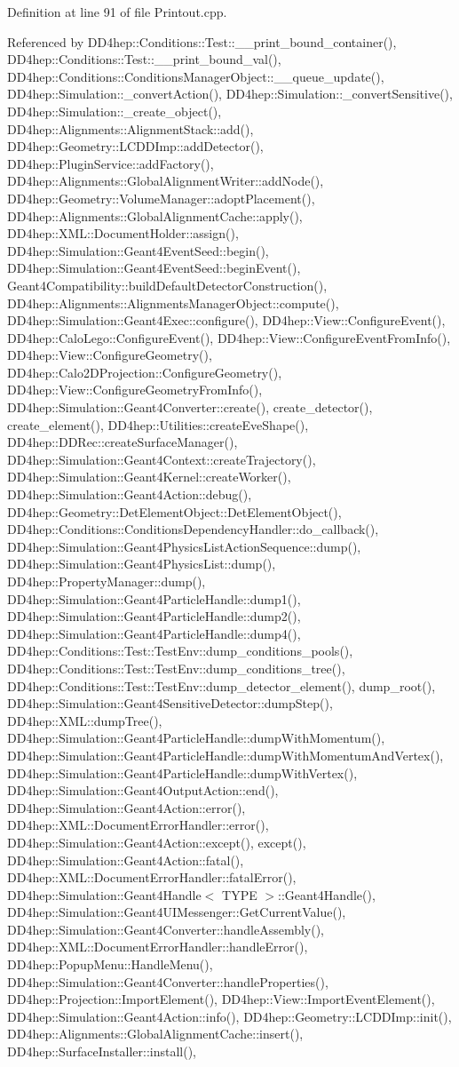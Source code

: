 Definition at line 91 of file Printout.cpp.

Referenced by DD4hep::Conditions::Test::\_\-\_\-print\_\-bound\_\-container(), DD4hep::Conditions::Test::\_\-\_\-print\_\-bound\_\-val(), DD4hep::Conditions::ConditionsManagerObject::\_\-\_\-queue\_\-update(), DD4hep::Simulation::\_\-convertAction(), DD4hep::Simulation::\_\-convertSensitive(), DD4hep::Simulation::\_\-create\_\-object(), DD4hep::Alignments::AlignmentStack::add(), DD4hep::Geometry::LCDDImp::addDetector(), DD4hep::PluginService::addFactory(), DD4hep::Alignments::GlobalAlignmentWriter::addNode(), DD4hep::Geometry::VolumeManager::adoptPlacement(), DD4hep::Alignments::GlobalAlignmentCache::apply(), DD4hep::XML::DocumentHolder::assign(), DD4hep::Simulation::Geant4EventSeed::begin(), DD4hep::Simulation::Geant4EventSeed::beginEvent(), Geant4Compatibility::buildDefaultDetectorConstruction(), DD4hep::Alignments::AlignmentsManagerObject::compute(), DD4hep::Simulation::Geant4Exec::configure(), DD4hep::View::ConfigureEvent(), DD4hep::CaloLego::ConfigureEvent(), DD4hep::View::ConfigureEventFromInfo(), DD4hep::View::ConfigureGeometry(), DD4hep::Calo2DProjection::ConfigureGeometry(), DD4hep::View::ConfigureGeometryFromInfo(), DD4hep::Simulation::Geant4Converter::create(), create\_\-detector(), create\_\-element(), DD4hep::Utilities::createEveShape(), DD4hep::DDRec::createSurfaceManager(), DD4hep::Simulation::Geant4Context::createTrajectory(), DD4hep::Simulation::Geant4Kernel::createWorker(), DD4hep::Simulation::Geant4Action::debug(), DD4hep::Geometry::DetElementObject::DetElementObject(), DD4hep::Conditions::ConditionsDependencyHandler::do\_\-callback(), DD4hep::Simulation::Geant4PhysicsListActionSequence::dump(), DD4hep::Simulation::Geant4PhysicsList::dump(), DD4hep::PropertyManager::dump(), DD4hep::Simulation::Geant4ParticleHandle::dump1(), DD4hep::Simulation::Geant4ParticleHandle::dump2(), DD4hep::Simulation::Geant4ParticleHandle::dump4(), DD4hep::Conditions::Test::TestEnv::dump\_\-conditions\_\-pools(), DD4hep::Conditions::Test::TestEnv::dump\_\-conditions\_\-tree(), DD4hep::Conditions::Test::TestEnv::dump\_\-detector\_\-element(), dump\_\-root(), DD4hep::Simulation::Geant4SensitiveDetector::dumpStep(), DD4hep::XML::dumpTree(), DD4hep::Simulation::Geant4ParticleHandle::dumpWithMomentum(), DD4hep::Simulation::Geant4ParticleHandle::dumpWithMomentumAndVertex(), DD4hep::Simulation::Geant4ParticleHandle::dumpWithVertex(), DD4hep::Simulation::Geant4OutputAction::end(), DD4hep::Simulation::Geant4Action::error(), DD4hep::XML::DocumentErrorHandler::error(), DD4hep::Simulation::Geant4Action::except(), except(), DD4hep::Simulation::Geant4Action::fatal(), DD4hep::XML::DocumentErrorHandler::fatalError(), DD4hep::Simulation::Geant4Handle$<$ TYPE $>$::Geant4Handle(), DD4hep::Simulation::Geant4UIMessenger::GetCurrentValue(), DD4hep::Simulation::Geant4Converter::handleAssembly(), DD4hep::XML::DocumentErrorHandler::handleError(), DD4hep::PopupMenu::HandleMenu(), DD4hep::Simulation::Geant4Converter::handleProperties(), DD4hep::Projection::ImportElement(), DD4hep::View::ImportEventElement(), DD4hep::Simulation::Geant4Action::info(), DD4hep::Geometry::LCDDImp::init(), DD4hep::Alignments::GlobalAlignmentCache::insert(), DD4hep::SurfaceInstaller::install(), 